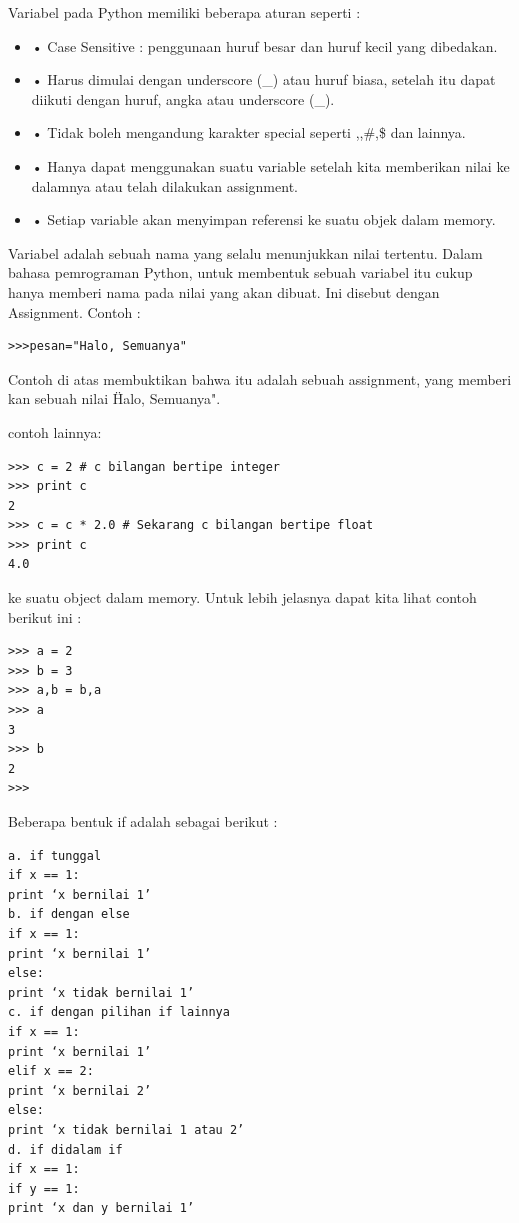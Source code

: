 Variabel pada Python memiliki beberapa aturan seperti :
\begin{itemize}
\item
•    Case Sensitive : penggunaan huruf besar dan huruf kecil yang dibedakan.
\item
•    Harus dimulai dengan underscore (_) atau huruf biasa, setelah itu dapat diikuti dengan huruf, angka atau underscore (_).
\item
•    Tidak boleh mengandung karakter special seperti \!,\@,\#,\$ dan lainnya.
\item
•    Hanya dapat menggunakan suatu variable setelah kita memberikan nilai ke dalamnya atau telah dilakukan assignment.
\item
•    Setiap variable akan menyimpan referensi ke suatu objek dalam memory.\cite{santoso2009bahasa}
\end{itemize}

Variabel adalah sebuah nama yang selalu menunjukkan nilai tertentu. Dalam bahasa pemrograman Python, untuk membentuk sebuah variabel itu cukup hanya memberi nama pada nilai yang akan dibuat. Ini disebut dengan Assignment.
Contoh : 
\begin{verbatim}
>>>pesan="Halo, Semuanya"
\end{verbatim}
Contoh di atas membuktikan bahwa itu adalah sebuah assignment, yang memberi kan sebuah nilai \"Halo, Semuanya".\cite{Utami2004logika}

contoh lainnya:
\begin{verbatim}
>>> c = 2 # c bilangan bertipe integer
>>> print c
2
>>> c = c * 2.0 # Sekarang c bilangan bertipe float
>>> print c
4.0
\end{verbatim}

ke suatu object dalam memory. Untuk lebih jelasnya
dapat kita lihat contoh berikut ini :
\begin{verbatim}
>>> a = 2
>>> b = 3
>>> a,b = b,a
>>> a
3
>>> b
2
>>>
\end{verbatim}

Beberapa bentuk if adalah sebagai berikut :
\begin{verbatim}
a. if tunggal
if x == 1:
print ‘x bernilai 1’
b. if dengan else
if x == 1:
print ‘x bernilai 1’
else:
print ‘x tidak bernilai 1’
c. if dengan pilihan if lainnya
if x == 1:
print ‘x bernilai 1’
elif x == 2:
print ‘x bernilai 2’
else:
print ‘x tidak bernilai 1 atau 2’
d. if didalam if
if x == 1:
if y == 1:
print ‘x dan y bernilai 1’
\end{verbatim}

